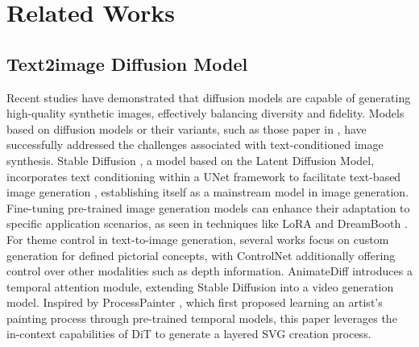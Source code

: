 \section{Related Works}
\subsection{Text2image Diffusion Model}

Recent studies have demonstrated that diffusion models are capable of generating high-quality synthetic images, effectively balancing diversity and fidelity. Models based on diffusion models or their variants, such as those paper in  \cite{sd, dit}, have successfully addressed the challenges associated with text-conditioned image synthesis. Stable Diffusion  \cite{sd}, a model based on the Latent Diffusion Model, incorporates text conditioning within a UNet framework to facilitate text-based image generation \cite{diffsim, idp, anti}, establishing itself as a mainstream model in image generation. Fine-tuning pre-trained image generation models can enhance their adaptation to specific application scenarios, as seen in techniques like LoRA  \cite{lora} and DreamBooth  \cite{dreamfusion}. For theme control in text-to-image generation, several works  \cite{ipa, instantid, ssr, fast_icassp, makeup, hair} focus on custom generation for defined pictorial concepts, with ControlNet  \cite{controlnet} additionally offering control over other modalities such as depth information.  AnimateDiff \cite{animatediff} introduces a temporal attention module, extending Stable Diffusion into a video generation model. Inspired by ProcessPainter \cite{processpainter}, which first proposed learning an artist's painting process through pre-trained temporal models, this paper leverages the in-context capabilities of DiT to generate a layered SVG creation process.



